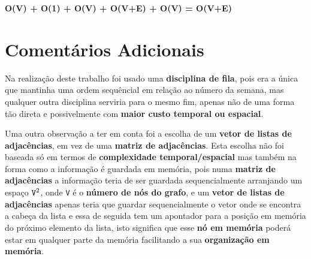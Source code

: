 \documentclass[11pt]{article}
\begin{document}
\begin{center}
    \textbf{O(V) + O(1) + O(V) + O(V+E) + O(V) = O(V+E)}
\end{center}

\section{Comentários Adicionais}

\hspace{0,5cm}Na realização deste trabalho foi usado uma \textbf{disciplina de fila}, pois era a única
que mantinha uma ordem sequêncial em relação ao número da semana, mas qualquer outra disciplina
serviria para o mesmo fim, apenas não de uma forma tão direta e possivelmente com \textbf{maior custo
temporal ou espacial}.

Uma outra observação a ter em conta foi a escolha de um \textbf{vetor de listas de adjacências}, em vez
de uma \textbf{matriz de adjacências}. Esta escolha não foi baseada só em termos de \textbf{complexidade
temporal/espacial} mas também na forma como a informação é guardada em memória, pois numa \textbf{matriz
de adjacências} a informação teria de ser guardada sequencialmente arranjando um espaço $\verb|V|^{2}$,
onde \verb|V| é o \textbf{número de nós do grafo}, e um \textbf{vetor de listas de adjacências} apenas
teria que guardar sequencialmente o vetor onde se encontra a cabeça da lista e essa de seguida tem um
apontador para a posição em memória do próximo elemento da lista, isto significa que esse \textbf{nó em
memória} poderá estar em qualquer parte da memória facilitando a sua \textbf{organização em memória}.
\end{document}
